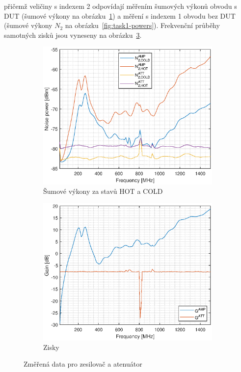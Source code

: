 \documentclass[11pt,a4paper]{article}
\begin{document}
přičemž veličiny s indexem 2 odpovídají měřením šumových výkonů obvodu s DUT (šumové výkony na obrázku~\ref{fig:task2-powers}) a měření s indexem 1 obvodu bez DUT (šumové výkony $N_2$ na obrázku~\ref{fig:task1-powers}). Frekvenční průběhy samotných zisků jsou vyneseny na obrázku~\ref{fig:task2-gains}.
\begin{figure}[!ht]
    \centering
    \begin{subfigure}{.45\textwidth}
        \centering
        \includegraphics[width=\textwidth]{src/task2-powers.eps}
        \caption{Šumové výkony za stavů HOT a COLD}
        \label{fig:task2-powers}
    \end{subfigure}
    \begin{subfigure}{.45\textwidth}
        \centering
        \includegraphics[width=\textwidth]{src/task2-gains.eps}
        \caption{Zisky}
        \label{fig:task2-gains}
    \end{subfigure}
    \caption{Změřená data pro zesilovač a atenuátor}
\end{figure}
\end{document}
